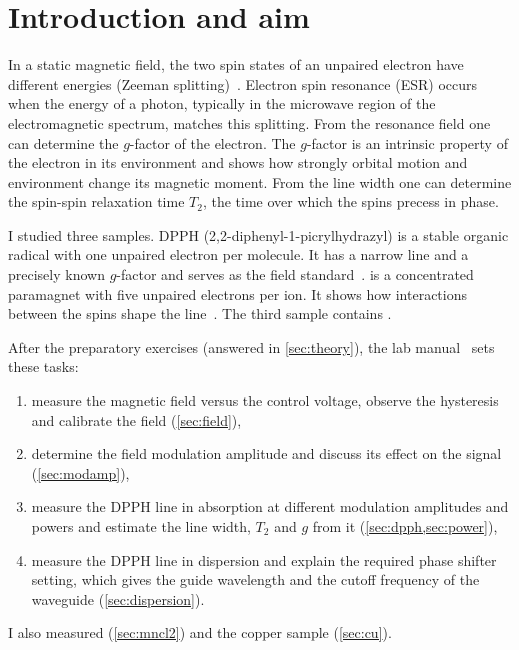 \section{Introduction and aim}\label{sec:introduction}
In a static magnetic field, the two spin states of an unpaired electron have different energies (Zeeman
splitting)~\cite{weil2007,slichter1990}. Electron spin resonance (ESR) occurs when the energy of a photon, typically in
the microwave region of the electromagnetic spectrum, matches this splitting. From the resonance field one can determine
the $g$-factor of the electron. The $g$-factor is an intrinsic property of the electron in its environment and shows how
strongly orbital motion and environment change its magnetic moment. From the line width one can determine the spin-spin
relaxation time $T_2$, the time over which the spins precess in phase.

I studied three samples. DPPH (2,2-diphenyl-1-picrylhydrazyl) is a stable organic radical with one unpaired electron
per molecule. It has a narrow line and a precisely known $g$-factor and serves as the field standard~\cite{poole1996}.  is a
concentrated paramagnet with five unpaired electrons per ion. It shows how interactions between the spins shape the
line~\cite{vanvleck1948,anderson1953}. The third sample contains .

After the preparatory exercises (answered in \cref{sec:theory}), the lab manual~\cite{shiroka} sets these tasks:
\begin{enumerate}
  \item measure the magnetic field versus the control voltage, observe the hysteresis and calibrate the field
    (\cref{sec:field}),
  \item determine the field modulation amplitude and discuss its effect on the signal
    (\cref{sec:modamp}),
  \item measure the DPPH line in absorption at different modulation amplitudes and powers and estimate the line width,
    $T_2$ and $g$ from it (\cref{sec:dpph,sec:power}),
  \item measure the DPPH line in dispersion and explain the required phase shifter setting, which gives the guide
    wavelength and the cutoff frequency of the waveguide (\cref{sec:dispersion}).
\end{enumerate}
I also measured  (\cref{sec:mncl2}) and the copper sample (\cref{sec:cu}).
